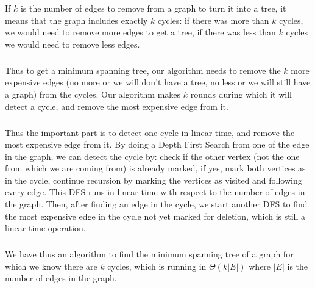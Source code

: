 If $k$ is the number of edges to remove from a graph to turn it into a tree, it means that the graph includes exactly $k$ cycles: if there was more than $k$ cycles, we would need to remove more edges to get a tree, if there was less than $k$ cycles we would need to remove less edges.

\subparagraph{}
Thus to get a minimum spanning tree, our algorithm needs to remove the $k$ more expensive edges (no more or we will don't have a tree, no less or we will still have a graph) from the cycles. Our algorithm makes $k$ rounds during which it will detect a cycle, and remove the most expensive edge from it.

\subparagraph{}
Thus the important part is to detect one cycle in linear time, and remove the most expensive edge from it.
By doing a Depth First Search from one of the edge in the graph, we can detect the cycle by: check if the other vertex (not the one from which we are coming from) is already marked, if yes, mark both vertices as in the cycle, continue recursion by marking the vertices as visited and following every edge.
This DFS runs in linear time with respect to the number of edges in the graph.
Then, after finding an edge in the cycle, we start another DFS to find the most expensive edge in the cycle not yet marked for deletion, which is still a linear time operation.

\subparagraph{}
We have thus an algorithm to find the minimum spanning tree of a graph for which we know there are $k$ cycles, which is running in $\Theta(k|E|)$ where $|E|$ is the number of edges in the graph.

